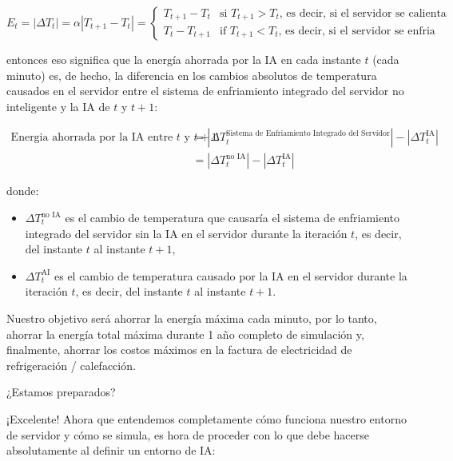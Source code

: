 \documentclass[
]{book}
\providecommand{\tightlist}{%
  \setlength{\itemsep}{0pt}\setlength{\parskip}{0pt}}
\begin{document}
\begin{equation*}
E_t = |\Delta T_t| = \alpha |T_{t+1} - T_t| =
\begin{cases}
T_{t+1} - T_t & \textrm{si $T_{t+1} > T_t$, es decir, si el servidor se calienta} \\
T_t - T_{t+1} & \textrm{if $T_{t+1} < T_t$, es decir, si el servidor se enfria}
\end{cases}
\end{equation*}

\hfill\break

entonces eso significa que la energía ahorrada por la IA en cada instante \(t\) (cada minuto) es, de hecho, la diferencia en los cambios absolutos de temperatura causados en el servidor entre el sistema de enfriamiento integrado del servidor no inteligente y la IA de \(t\) y \(t + 1\):

\begin{align*}
        \textrm{Energia ahorrada por la IA entre $t$ y $t+1$}
        & = |\Delta T_t^{\textrm{Sistema de Enfriamiento Integrado del Servidor}}| - |\Delta T_t^{\textrm{IA}}| \\
        & = |\Delta T_t^{\textrm{no IA}}| - |\Delta T_t^{\textrm{IA}}|
\end{align*}

donde:

\begin{itemize}
\tightlist
\item
  \(\Delta T_t^{\textrm{no IA}}\) es el cambio de temperatura que causaría el sistema de enfriamiento integrado del servidor sin la IA en el servidor durante la iteración \(t\), es decir, del instante \(t\) al instante \(t + 1\),
\item
  \(\Delta T_t^{\textrm{AI}}\) es el cambio de temperatura causado por la IA en el servidor durante la iteración \(t\), es decir, del instante \(t\) al instante \(t + 1\).
\end{itemize}

Nuestro objetivo será ahorrar la energía máxima cada minuto, por lo tanto, ahorrar la energía total máxima durante 1 año completo de simulación y, finalmente, ahorrar los costos máximos en la factura de electricidad de refrigeración / calefacción.

¿Estamos preparados?

¡Excelente! Ahora que entendemos completamente cómo funciona nuestro entorno de servidor y cómo se simula, es hora de proceder con lo que debe hacerse absolutamente al definir un entorno de IA:
\end{document}
